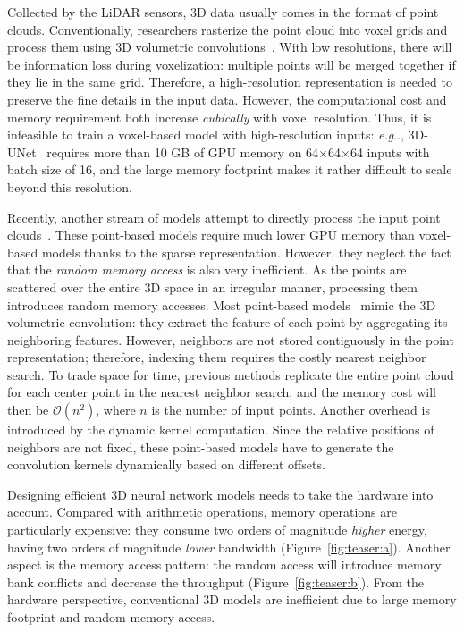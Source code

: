 \documentclass{article}
\makeatletter
\newcommand{\fig}[1]{Figure~\ref{#1}}
\DeclareRobustCommand\onedot{\futurelet\@let@token\@onedot}
\def\@onedot{\ifx\@let@token.\else.\null\fi\xspace}
\def\eg{\emph{e.g}\onedot} \def\Eg{\emph{E.g}\onedot}
\makeatother
\begin{document}
Collected by the LiDAR sensors, 3D data usually comes in the format of point clouds. Conventionally, researchers rasterize the point cloud into voxel grids and process them using 3D volumetric convolutions~\cite{Choy:2016us,Riegler:2017vk}. With low resolutions, there will be information loss during voxelization: multiple points will be merged together if they lie in the same grid. Therefore, a high-resolution representation is needed to preserve the fine details in the input data. However, the computational cost and memory requirement both increase \textit{cubically} with voxel resolution. Thus, it is infeasible to train a voxel-based model with high-resolution inputs: \eg, 3D-UNet~\cite{Cicek:2016un} requires more than 10 GB of GPU memory on 64$\times$64$\times$64 inputs with batch size of 16, and the large memory footprint makes it rather difficult to scale beyond this resolution.

Recently, another stream of models attempt to directly process the input point clouds~\cite{Qi:2017vq,Qi:2017tf,Klokov:2017te,Li:2018tp}. These point-based models require much lower GPU memory than voxel-based models thanks to the sparse representation. However, they neglect the fact that the \textit{random memory access} is also very inefficient. As the points are scattered over the entire 3D space in an irregular manner, processing them introduces random memory accesses. Most point-based models~\cite{Li:2018tp} mimic the 3D volumetric convolution: they extract the feature of each point by aggregating its neighboring features. However, neighbors are not stored contiguously in the point representation; therefore, indexing them requires the costly nearest neighbor search. To trade space for time, previous methods replicate the entire point cloud for each center point in the nearest neighbor search, and the memory cost will then be $\mathcal{O}(n^2)$, where $n$ is the number of input points. Another overhead is introduced by the dynamic kernel computation. Since the relative positions of neighbors are not fixed, these point-based models have to generate the convolution kernels dynamically based on different offsets.

Designing efficient 3D neural network models needs to take the hardware into account. Compared with arithmetic operations, memory operations are particularly expensive: they consume two orders of magnitude \textit{higher} energy, having two orders of magnitude \textit{lower} bandwidth (\fig{fig:teaser:a}). Another aspect is the memory access pattern: the random access will introduce memory bank conflicts and decrease the throughput (\fig{fig:teaser:b}). From the hardware perspective, conventional 3D models are inefficient due to large memory footprint and random memory access.
\end{document}
